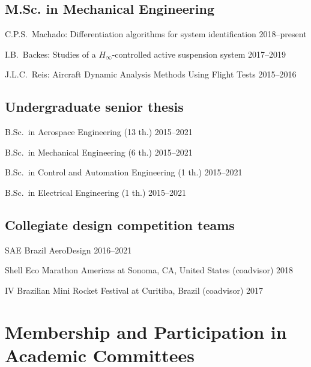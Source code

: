 \documentclass[a4paper, 11pt, oneside]{memoir}
\begin{document}
\subsection{M.Sc. in Mechanical Engineering}
\begin{shortdesc}
\item{\textnormal{C.P.S.~Machado:}} 
{Differentiation algorithms for system identification}
\hfill{2018--present}

\item {\textnormal{I.B.~Backes}}:
  {Studies of a $H_\infty$-controlled active suspension system}{}{}{}
  \hfill {2017--2019}

\item {\textnormal{J.L.C.~Reis}}:
  {Aircraft Dynamic Analysis Methods Using Flight Tests}{}{}{}
  \hfill {2015--2016}
\end{shortdesc}

\subsection{Undergraduate senior thesis}
\begin{shortdesc}
\item
  B.Sc.~in Aerospace Engineering (13 th.) \hfill {2015--2021}
\item
  B.Sc.~in Mechanical Engineering (6 th.) \hfill {2015--2021}
\item
  B.Sc.~in Control and Automation Engineering (1 th.) \hfill {2015--2021} 
\item
  B.Sc.~in Electrical Engineering (1 th.) \hfill {2015--2021} 
\end{shortdesc}

\subsection{Collegiate design competition teams}
\begin{shortdesc}
\item {SAE Brazil AeroDesign} \hfill 2016--2021
\item
{Shell Eco Marathon Americas at Sonoma, CA, United States (coadvisor)}
\hfill {2018}%
\item {IV Brazilian Mini Rocket Festival at Curitiba, Brazil (coadvisor)}
  \hfill {2017}
\end{shortdesc}

\section{Membership and Participation in Academic Committees}
\end{document}
